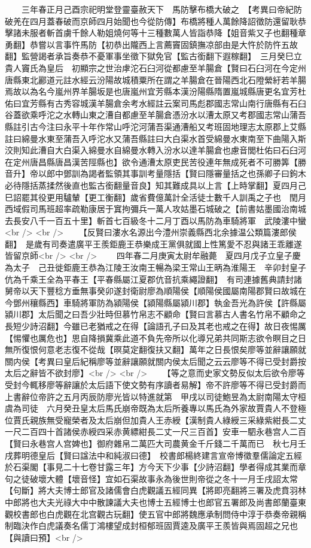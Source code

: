 　　三年春正月己酉宗祀明堂登靈臺赦天下　馬防擊布橋大破之　【考異曰帝紀防破羌在四月蓋春破而京師四月始聞也今從防傳】布橋將種人萬餘降詔徵防還留耿恭擊諸未服者斬首虜千餘人勒姐燒何等十三種數萬人皆詣恭降【姐音紫又子也翻種章勇翻】恭嘗以言事忤馬防【初恭出隴西上言薦竇固鎮撫凉部由是大忤於防忤五故翻】監營謁者承旨奏恭不憂軍事坐徵下獄免官【監古銜翻下遐稼翻】　三月癸巳立貴人竇氏為皇后　初顯宗之世治虖沱石臼河從都慮至羊腸倉【賢曰石臼河在今定州唐縣東北酈道元註水經云汾陽故城積粟所在謂之羊腸倉在晉陽西北石隥縈紆若羊腸焉故以為名今嵐州界羊腸坂是也唐嵐州宜芳縣本漢汾陽縣隋置嵐城縣唐更名宜芳杜佑曰宜芳縣有古秀容城漢羊腸倉余考水經註云案司馬彪郡國志常山南行唐縣有石臼谷蓋欲乘呼沱之水轉山東之漕自都慮至羊腸倉憑汾水以漕太原又考郡國志常山蒲吾縣註引古今注曰永平十年作常山呼沱河蒲吾渠通漕船又考班固地理志太原郡上艾縣註曰綿曼水東至蒲吾入呼沱水又蒲吾縣註曰大白渠水首受綿曼水東南至下曲陽入斯洨則知此漕自大白渠入綿曼水自綿曼水轉入汾水以達羊腸倉也慮音閭杜佑曰石臼河在定州唐昌縣唐昌漢苦陘縣也】欲令通漕太原吏民苦役連年無成死者不可勝筭【勝音升】帝以郎中鄧訓為謁者監領其事訓考量隱括【賢曰隱審量括之也孫卿子曰鉤木必待隱括蒸揉然後直也監古銜翻量音良】知其難成具以上言【上時掌翻】夏四月己巳詔罷其役更用驢輦【更工衡翻】歲省費億萬計全活徒士數千人訓禹之子也　閏月西域假司馬班超率疏勒康居于窴拘彌兵一萬人攻姑墨石城破之【前書姑墨國治南城去長安八千一百五十里】斬首七百級冬十二月丁酉以馬防為車騎將軍　武陵漊中蠻<br />
<br />
　　【反賢曰漊水名源出今澧州崇義縣西北余據温公類篇漊郎侯翻】　是歲有司奏遣廣平王羨鉅鹿王恭樂成王黨俱就國上性篤愛不忍與諸王乖離遂皆留京師<br />
<br />
　　四年春二月庚寅太尉牟融薨　夏四月戊子立皇子慶為太子　己丑徙鉅鹿王恭為江陵王汝南王暢為梁王常山王昞為淮陽王　辛卯封皇子伉為千乘王全為平春王【平春縣屬江夏郡伉音抗乘繩證翻】　有司連據舊典請封諸舅帝以天下豐稔方垂無事癸卯遂封衛尉廖為順陽侯【順陽侯國屬南陽郡賢曰故城在今鄧州穰縣西】車騎將軍防為潁陽侯【潁陽縣屬潁川郡】執金吾光為許侯【許縣屬潁川郡】太后聞之曰吾少壯時但慕竹帛志不顧命【賢曰言慕古人書名竹帛不顧命之長短少詩沼翻】今雖已老猶戒之在得【論語孔子曰及其老也戒之在得】故日夜惕厲【惕懼也厲危也】思自降損冀乘此道不負先帝所以化導兄弟共同斯志欲令瞑目之日無所復恨何意老志復不從哉【暝莫定翻復扶又翻】萬年之日長恨矣廖等並辭讓願就關内侯【考異曰皇后紀稱廖等並辭讓願就關内侯太后聞之云云廖等不得已受封爵按太后之辭皆不欲封廖】<br />
<br />
　　【等之意而史家文勢反似太后欲令廖等受封今輒移廖等辭讓於太后語下使文勢有序讀者易解】帝不許廖等不得已受封爵而上書辭位帝許之五月丙辰防廖光皆以特進就第　甲戌以司徒鮑昱為太尉南陽太守桓虞為司徒　六月癸丑皇太后馬氏崩帝既為太后所養專以馬氏為外家故賈貴人不登極位賈氏親族無受寵榮者及太后崩但加貴人王赤綬【漢制貴人綠綬三采綠紫紺長二丈一尺二百四十首諸侯赤綬四采赤黄縹紺長二丈一尺三百首】安車一駟永巷宫人二百【賢曰永巷宫人宫婢也】御府雜帛二萬匹大司農黄金千斤錢二千萬而已　秋七月壬戌葬明德皇后【賢曰諡法中和純淑曰德】　校書郎楊終建言宣帝博徵羣儒論定五經於石渠閣【事見二十七卷甘露三年】方今天下少事【少詩沼翻】學者得成其業而章句之徒破壞大體【壞音怪】宜如石渠故事永為後世則帝從之冬十一月壬戌詔太常【句斷】將大夫博士郎官及諸儒會白虎觀議五經同異【將即亮翻將三署及虎賁羽林中郎將也大夫光祿大中中散諫議大夫也博士五經博士也郎官五署郎及尚書郎蘭臺東觀校書郎也白虎觀在北宫觀古玩翻】使五官中郎將魏應承制問侍中淳于恭奏帝親稱制臨決作白虎議奏名儒丁鴻樓望成封桓郁班固賈逵及廣平王羨皆與焉固超之兄也【與讀曰預】<br />
